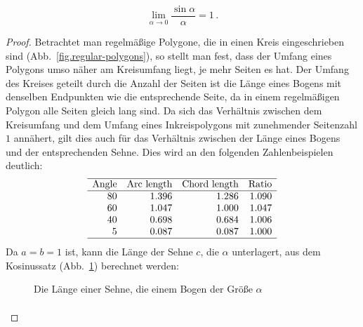 \begin{theorem}\label{thm.limit-sine-over}
\[
\lim_{\alpha\rightarrow 0}\frac{\sin\alpha}{\alpha}=1\,.
\]
\end{theorem}

\begin{proof}
Betrachtet man regelmäßige Polygone, die in einen Kreis eingeschrieben sind (Abb.~\ref{fig.regular-polygons}), so stellt man fest, dass der Umfang eines Polygons umso näher am Kreisumfang liegt, je mehr Seiten es hat. Der Umfang des Kreises geteilt durch die Anzahl der Seiten ist die Länge eines Bogens mit denselben Endpunkten wie die entsprechende Seite, da in einem regelmäßigen Polygon alle Seiten gleich lang sind. Da sich das Verhältnis zwischen dem Kreisumfang und dem Umfang eines Inkreispolygons mit zunehmender Seitenzahl $1$ annähert, gilt dies auch für das Verhältnis zwischen der Länge eines Bogens und der entsprechenden Sehne. Dies wird an den folgenden Zahlenbeispielen deutlich:
\[
\begin{array}{r@{\hspace{10pt}}r@{\hspace{10pt}}r@{\hspace{10pt}}r}
\hline
\textrm{Angle} & \textrm{Arc length} & \textrm{Chord length} & \textrm{Ratio}\\\hline
80 & 1.396 & 1.286  & 1.090\\
60 & 1.047 & 1.000  & 1.047\\
40 & 0.698 & 0.684 & 1.006\\
5  & 0.087 & 0.087 &1.000 \\\hline
\end{array}
\]
Da $a=b=1$ ist, kann die Länge der Sehne $c$, die $\alpha$ unterlagert, aus dem Kosinussatz  (Abb.~\ref{fig.length-of-a-chord}) berechnet werden:
\begin{figure}[t]
\begin{center}
\caption{Die Länge einer Sehne, die einem Bogen der Größe $\alpha$}\label{fig.length-of-a-chord}
\end{center}
\end{figure}
\begin{eqnarray*}

\end{eqnarray*}
\end{proof}
